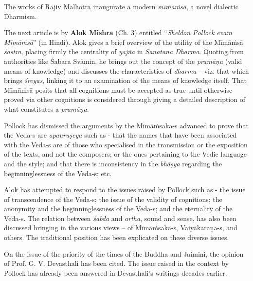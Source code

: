 The works of Rajiv Malhotra inaugurate a modern \textit{mīmāṁsā}, a novel dialectic Dharmism.

The next article is by \textbf{Alok Mishra} (Ch. 3) entitled “\textit{Sheldon Pollock evam Mīmāṁsā}” (in Hindi). Alok gives a brief overview of the utility of the Mīmāṁsā \textit{śāstra}, placing firmly the centrality of \textit{yajña} in \textit{Sanātana Dharma}. Quoting from authorities like Śabara Svāmin, he brings out the concept of the \textit{pramāṇa} (valid means of knowledge) and discusses the characteristics of \textit{dharma} – viz. that which brings \textit{śreyas}, linking it to an examination of the means of knowledge itself. That Mīmāṁsā posits that all cognitions must be accepted as true until otherwise proved via other cognitions is considered through giving a detailed description of what constitutes a \textit{pramāṇa}.

Pollock has dismissed the arguments by the Mīmāṁsaka-s advanced to prove that the Veda-s are \textit{apauruṣeya} such as - that the names that have been associated with the Veda-s are of those who specialised in the transmission or the exposition of the texts, and not the composers; or the ones pertaining to the Vedic language and the style; and that there is inconsistency in the \textit{bhāṣya} regarding the beginninglessness of the Veda-s; etc.

Alok has attempted to respond to the issues raised by Pollock such as - the issue of transcendence of the Veda-s; the issue of the validity of cognitions; the anonymity and the beginninglessness of the Veda-s; and the eternality of the Veda-s. The relation between \textit{śabda} and \textit{artha}, sound and sense, has also been discussed bringing in the various views – of Mīmāṁsaka-s, Vaiyākaraṇa-s, and others. The traditional position has been explicated on these diverse issues.

On the issue of the priority of the times of the Buddha and Jaimini, the opinion of Prof. G. V. Devasthali has been cited. The issue raised in the context by Pollock has already been answered in Devasthali’s writings decades earlier. 

